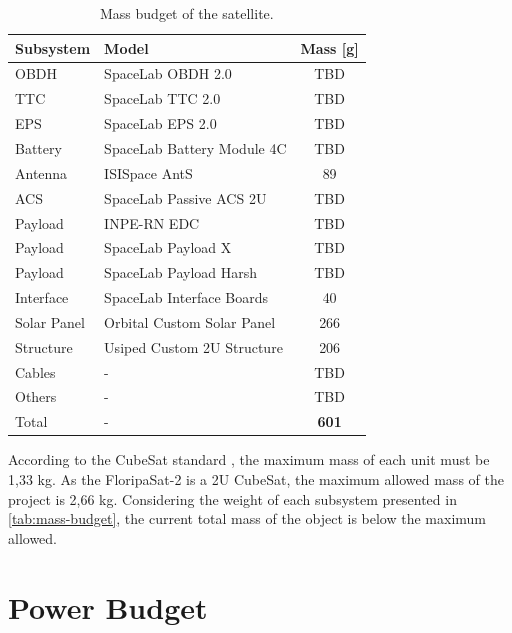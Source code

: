 \begin{table}[!h]
    \centering
    \begin{tabular}{llc}
        \toprule[1.5pt]
        \textbf{Subsystem} & \textbf{Model} & \textbf{Mass [g]} \\
        \midrule
        OBDH            & SpaceLab OBDH 2.0             & TBD \\
        TTC             & SpaceLab TTC 2.0              & TBD \\
        EPS             & SpaceLab EPS 2.0              & TBD \\
        Battery         & SpaceLab Battery Module 4C    & TBD \\
        Antenna         & ISISpace AntS                 & 89 \\
        ACS             & SpaceLab Passive ACS 2U       & TBD \\
        Payload         & INPE-RN EDC                   & TBD \\
        Payload         & SpaceLab Payload X            & TBD \\
        Payload         & SpaceLab Payload Harsh        & TBD \\
        Interface       & SpaceLab Interface Boards     & 40 \\
        Solar Panel     & Orbital Custom Solar Panel    & 266 \\
        Structure       & Usiped Custom 2U Structure    & 206 \\
        Cables          & -                             & TBD \\
        Others          & -                             & TBD \\
        \midrule
        Total           & -                             & \textbf{601} \\
        \bottomrule[1.5pt]
    \end{tabular}
    \caption{Mass budget of the satellite.}
    \label{tab:mass-budget}
\end{table}

According to the CubeSat standard \cite{cds}, the maximum mass of each unit must be 1,33 kg. As the FloripaSat-2 is a 2U CubeSat, the maximum allowed mass of the project is 2,66 kg. Considering the weight of each subsystem presented in \autoref{tab:mass-budget}, the current total mass of the object is below the maximum allowed.

\section{Power Budget} \label{power-budget}

